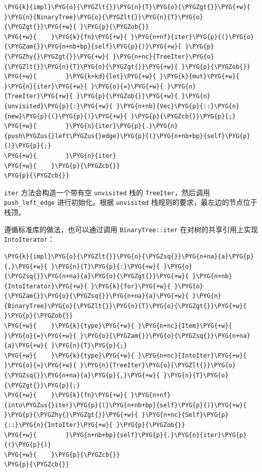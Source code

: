 \begin{Verbatim}[commandchars=\\\{\},breaklines=true,breakanywhere=true,fontsize=\codefont,xleftmargin=17bp]
\PYG{k}{impl}\PYG{o}{\PYGZlt{}}\PYG{n}{T}\PYG{o}{\PYGZgt{}}\PYG{+w}{ }\PYG{n}{BinaryTree}\PYG{o}{\PYGZlt{}}\PYG{n}{T}\PYG{o}{\PYGZgt{}}\PYG{+w}{ }\PYG{p}{\PYGZob{}}
\PYG{+w}{    }\PYG{k}{fn}\PYG{+w}{ }\PYG{n+nf}{iter}\PYG{p}{(}\PYG{o}{\PYGZam{}}\PYG{n+nb+bp}{self}\PYG{p}{)}\PYG{+w}{ }\PYG{p}{\PYGZhy{}\PYGZgt{}}\PYG{+w}{ }\PYG{n+nc}{TreeIter}\PYG{o}{\PYGZlt{}}\PYG{n}{T}\PYG{o}{\PYGZgt{}}\PYG{+w}{ }\PYG{p}{\PYGZob{}}
\PYG{+w}{        }\PYG{k+kd}{let}\PYG{+w}{ }\PYG{k}{mut}\PYG{+w}{ }\PYG{n}{iter}\PYG{+w}{ }\PYG{o}{=}\PYG{+w}{ }\PYG{n}{TreeIter}\PYG{+w}{ }\PYG{p}{\PYGZob{}}\PYG{+w}{ }\PYG{n}{unvisited}\PYG{p}{:}\PYG{+w}{ }\PYG{n+nb}{Vec}\PYG{p}{::}\PYG{n}{new}\PYG{p}{(}\PYG{p}{)}\PYG{+w}{ }\PYG{p}{\PYGZcb{}}\PYG{p}{;}
\PYG{+w}{        }\PYG{n}{iter}\PYG{p}{.}\PYG{n}{push\PYGZus{}left\PYGZus{}edge}\PYG{p}{(}\PYG{n+nb+bp}{self}\PYG{p}{)}\PYG{p}{;}
\PYG{+w}{        }\PYG{n}{iter}
\PYG{+w}{    }\PYG{p}{\PYGZcb{}}
\PYG{p}{\PYGZcb{}}
\end{Verbatim}

\texttt{iter} 方法会构造一个带有空 \texttt{unvisited} 栈的 \texttt{TreeIter}，然后调用 \texttt{push\_left\_edge} 进行初始化。根据 \texttt{unvisited} 栈规则的要求，最左边的节点位于栈顶。

遵循标准库的做法，也可以通过调用 \texttt{BinaryTree::iter} 在对树的共享引用上实现 \texttt{IntoIterator}：

\begin{Verbatim}[commandchars=\\\{\},breaklines=true,breakanywhere=true,fontsize=\codefont,xleftmargin=17bp]
\PYG{k}{impl}\PYG{o}{\PYGZlt{}}\PYG{o}{\PYGZsq{}}\PYG{n+na}{a}\PYG{p}{,}\PYG{+w}{ }\PYG{n}{T}\PYG{p}{:}\PYG{+w}{ }\PYG{o}{\PYGZsq{}}\PYG{n+na}{a}\PYG{o}{\PYGZgt{}}\PYG{+w}{ }\PYG{n+nb}{IntoIterator}\PYG{+w}{ }\PYG{k}{for}\PYG{+w}{ }\PYG{o}{\PYGZam{}}\PYG{o}{\PYGZsq{}}\PYG{n+na}{a}\PYG{+w}{ }\PYG{n}{BinaryTree}\PYG{o}{\PYGZlt{}}\PYG{n}{T}\PYG{o}{\PYGZgt{}}\PYG{+w}{ }\PYG{p}{\PYGZob{}}
\PYG{+w}{    }\PYG{k}{type}\PYG{+w}{ }\PYG{n+nc}{Item}\PYG{+w}{ }\PYG{o}{=}\PYG{+w}{ }\PYG{o}{\PYGZam{}}\PYG{o}{\PYGZsq{}}\PYG{n+na}{a}\PYG{+w}{ }\PYG{n}{T}\PYG{p}{;}
\PYG{+w}{    }\PYG{k}{type}\PYG{+w}{ }\PYG{n+nc}{IntoIter}\PYG{+w}{ }\PYG{o}{=}\PYG{+w}{ }\PYG{n}{TreeIter}\PYG{o}{\PYGZlt{}}\PYG{o}{\PYGZsq{}}\PYG{n+na}{a}\PYG{p}{,}\PYG{+w}{ }\PYG{n}{T}\PYG{o}{\PYGZgt{}}\PYG{p}{;}
\PYG{+w}{    }\PYG{k}{fn}\PYG{+w}{ }\PYG{n+nf}{into\PYGZus{}iter}\PYG{p}{(}\PYG{n+nb+bp}{self}\PYG{p}{)}\PYG{+w}{ }\PYG{p}{\PYGZhy{}\PYGZgt{}}\PYG{+w}{ }\PYG{n+nc}{Self}\PYG{p}{::}\PYG{n}{IntoIter}\PYG{+w}{ }\PYG{p}{\PYGZob{}}
\PYG{+w}{        }\PYG{n+nb+bp}{self}\PYG{p}{.}\PYG{n}{iter}\PYG{p}{(}\PYG{p}{)}
\PYG{+w}{    }\PYG{p}{\PYGZcb{}}
\PYG{p}{\PYGZcb{}}
\end{Verbatim}


